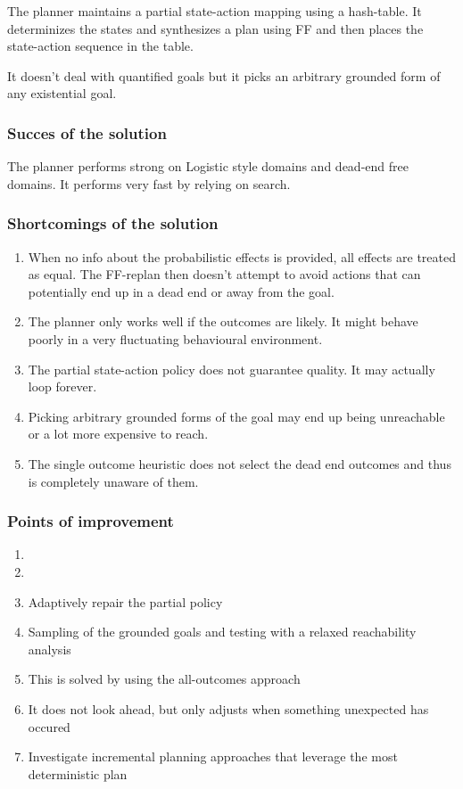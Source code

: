 \documentclass[runningheads,a4paper]{llncs}
\begin{document}
The planner maintains a partial state-action mapping using a hash-table. It determinizes the states and synthesizes a plan using FF and then places the state-action sequence in the table. 

It doesn't deal with quantified goals but it picks an arbitrary grounded form of any existential goal. 

\subsubsection{Succes of the solution}
The planner performs strong on Logistic style domains and dead-end free domains. It performs very fast by relying on search. 

\subsubsection{Shortcomings of the solution}
\begin{enumerate}
	\item When no info about the probabilistic effects is provided, all effects are treated as equal. The FF-replan then doesn't attempt to avoid actions that can potentially end up in a dead end or away from the goal.
	\item  The planner only works well if the outcomes are likely. It might behave poorly in a very fluctuating behavioural environment. 
	\item The partial state-action policy does not guarantee quality. It may actually loop forever.  
	\item Picking arbitrary grounded forms of the goal may end up being unreachable or a lot more expensive to reach.
	\item The single outcome heuristic does not select the dead end outcomes and thus is completely unaware of them.  
\end{enumerate}

\subsubsection{Points of improvement}
\begin{enumerate}
	\item
	\item 
	\item Adaptively repair the partial policy 
	\item Sampling of the grounded goals and testing with a relaxed reachability analysis
	\item This is solved by using the all-outcomes approach
	\item It does not look ahead, but only adjusts when something unexpected has occured

	\item Investigate incremental planning approaches that leverage the most deterministic plan
\end{enumerate}
\end{document}
